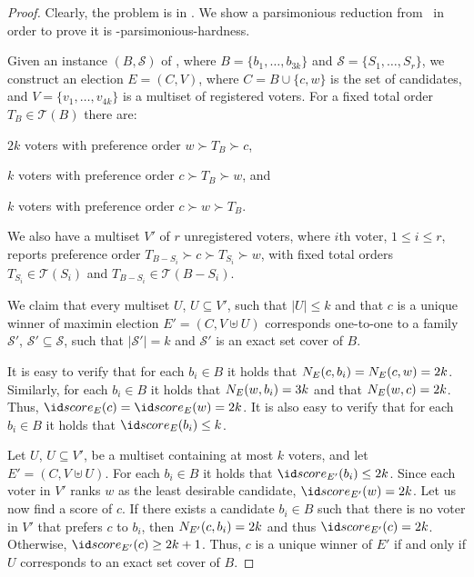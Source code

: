 \begin{proof}
Clearly, the problem is in \sharpPclass.
We show a parsimonious reduction from \sharpXthreeC\ in order to prove it is \sharpPclass-parsimonious-hardness.

Given an instance $(B,\mathcal{S})$ of \sharpXthreeC, where $B=\{b_1,\dots,b_{3k}\}$ and $\mathcal{S}=\{S_1,\dots,S_r\}$, we construct an election $E=(C,V)$, where $C=B\cup\{c,w\}$ is the set of candidates, and $V=\{v_1,\dots,v_{4k}\}$ is a multiset of registered voters.
For a fixed total order $T_B\in\mathcal{T}(B)$ there are:
\begin{Enumerate}
	\item $2k$ voters with preference order $w\succ T_B\succ c$,
	\item $k$ voters with preference order $c\succ T_B\succ w$, and
	\item $k$ voters with preference order $c\succ w\succ T_B$.
\end{Enumerate}
We also have a multiset $V'$ of $r$ unregistered voters, where $i$th voter, $1\le i\le r$, reports preference order $T_{B-S_i}\succ c\succ T_{S_i}\succ w$, with fixed total orders $T_{S_i}\in\mathcal{T}(S_i)$ and $T_{B-S_i}\in\mathcal{T}(B-S_i)$.

We claim that every multiset $U$, $U\subseteq V'$, such that $|U|\le k$ and that $c$ is a unique winner of maximin election $E'=(C,V\uplus U)$ corresponds one-to-one to a family $\mathcal{S'}$, $\mathcal{S'}\subseteq\mathcal{S}$, such that $|\mathcal{S'}|=k$ and $\mathcal{S'}$ is an exact set cover of $B$.

It is easy to verify that for each $b_i\in B$ it holds that $N_{E}(c,b_i)=N_{E}(c,w)=2k$.
Similarly, for each $b_i\in B$ it holds that $N_{E}(w,b_i)=3k$ and that $N_{E}(w,c)=2k$.
Thus, $\score{E}(c)=\score{E}(w)=2k$.
It is also easy to verify that for each $b_i\in B$ it holds that $\score{E}(b_i)\le k$.

Let $U$, $U\subseteq V'$, be a multiset containing at most $k$ voters, and let $E'=(C,V\uplus U)$.
For each $b_i\in B$ it holds that $\score{E'}(b_i)\le2k$.
Since each voter in $V'$ ranks $w$ as the least desirable candidate, $\score{E'}(w)=2k$.
Let us now find a score of $c$.
If there exists a candidate $b_i\in B$ such that there is no voter in $V'$ that prefers $c$ to $b_i$, then $N_{E'}(c,b_i)=2k$ and thus $\score{E'}(c)=2k$.
Otherwise, $\score{E'}(c)\ge2k+1$.
Thus, $c$ is a unique winner of $E'$ if and only if $U$ corresponds to an exact set cover of $B$.
\end{proof}

